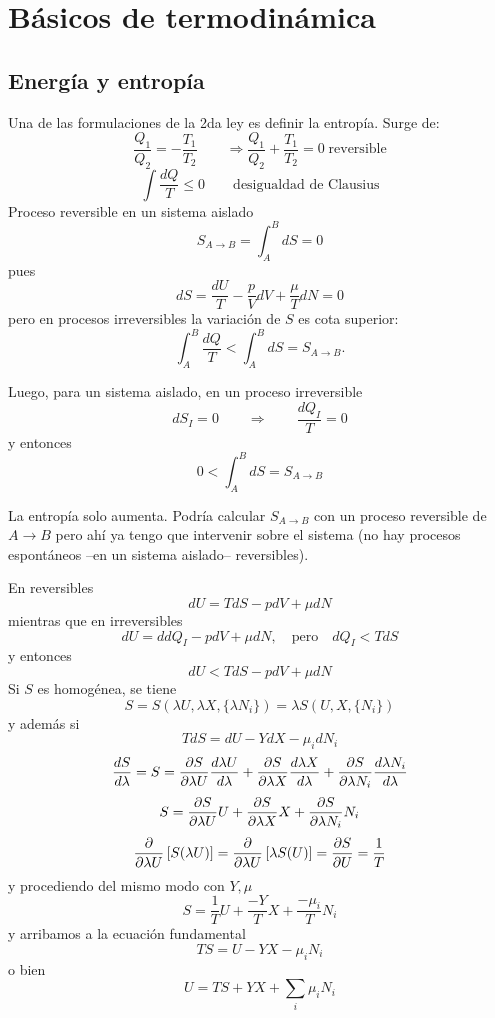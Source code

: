 \documentclass[10pt,oneside]{CBFT_book}
\begin{document}
\chapter{Básicos de termodinámica}


\section{Energía y entropía}

Una de las formulaciones de la 2da ley es definir la entropía. Surge de:
\[
	\frac{Q_1}{Q_2} = -\frac{T_1}{T_2} \qquad \Rightarrow \frac{Q_1}{Q_2} + \frac{T_1}{T_2} = 0 \;
	\text{reversible}
\]
\[
	\int \frac{dQ}{T} \leq 0 \qquad \text{desigualdad de Clausius}
\] 
Proceso reversible en un sistema aislado
\[
	S_{A\to B} = \int_A^B dS = 0
\]
pues 
\[
	dS =\frac{dU}{T} - \frac{p}{V}dV + \frac{\mu}{T}dN = 0
\]
pero en procesos irreversibles la variación de $S$ es cota superior:
\[
	\int_A^B \frac{dQ}{T} < \int_A^B dS = S_{A\to B}.
\]

Luego, para un sistema aislado, en un proceso irreversible 
\[
	dS_I = 0 \qquad \Rightarrow \qquad \frac{dQ_I}{T} = 0
\]
y entonces
\[
	0 < \int_A^B  dS =  S_{A\to B}
\]

La entropía solo aumenta. Podría calcular $S_{A\to B}$ con un proceso reversible de $A\to B$ pero ahí 
ya tengo que intervenir sobre el sistema (no hay procesos espontáneos --en un sistema aislado-- reversibles).

En reversibles
\[
	dU = TdS - pdV + \mu dN
\]
mientras que en irreversibles
\[
	dU = ddQ_I - pdV +\mu dN, \quad \text{pero} \quad dQ_I < TdS 
\]
y entonces
\[
	dU < TdS - pdV + \mu dN
\]
Si $S$ es homogénea, se tiene
\[
	S = S(\lambda U, \lambda X, \{\lambda N_i\}) = \lambda S( U, X, \{ N_i\})
\]
y además si 
\[
	TdS = dU - YdX - \mu_i dN_i
\]
\[
	\frac{d^{\hspace{-0.05em}} {S}}{d {\lambda}^{\hspace{-0.05em}}} = S = \frac{\partial^{\hspace{-0.05em}} {S}}{\partial {\lambda U}^{\hspace{-0.05em}}}\frac{d^{\hspace{-0.05em}} {\lambda U}}{d {\lambda}^{\hspace{-0.05em}}} +
	\frac{\partial^{\hspace{-0.05em}} {S}}{\partial {\lambda X}^{\hspace{-0.05em}}}\frac{d^{\hspace{-0.05em}} {\lambda X}}{d {\lambda}^{\hspace{-0.05em}}} +
	\frac{\partial^{\hspace{-0.05em}} {S}}{\partial {\lambda N_i}^{\hspace{-0.05em}}}\frac{d^{\hspace{-0.05em}} {\lambda N_i}}{d {\lambda}^{\hspace{-0.05em}}}
\]
\[
	S = \frac{\partial^{\hspace{-0.05em}} {S}}{\partial {\lambda U}^{\hspace{-0.05em}}} U + \frac{\partial^{\hspace{-0.05em}} {S}}{\partial {\lambda X}^{\hspace{-0.05em}}} X + \frac{\partial^{\hspace{-0.05em}} {S}}{\partial {\lambda N_i}^{\hspace{-0.05em}}} N_i
\]
\[
	\frac{\partial^{\hspace{-0.05em}} {}}{\partial {\lambda U}^{\hspace{-0.05em}}}\left[ S(\lambda U)\right] = 
	\frac{\partial^{\hspace{-0.05em}} {}}{\partial {\lambda U}^{\hspace{-0.05em}}}\left[ \lambda S( U)\right] = \frac{\partial^{\hspace{-0.05em}} {S}}{\partial {U}^{\hspace{-0.05em}}} = \frac{1}{T}
\]
y procediendo del mismo modo con $Y,\mu$
\[
	S = \frac{1}{T} U + \frac{-Y}{T} X + \frac{-\mu_i}{T} N_i
\]
y arribamos a la ecuación fundamental
\[
	TS = U - YX - \mu_i N_i 
\]
o bien
\[
	U = TS + YX + \sum_i \mu_i N_i
\]
\end{document}
